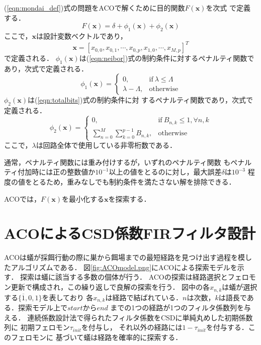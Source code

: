\documentclass[dvipdfmx,9pt]{ieej}
\begin{document}
(\ref{eqn:mondai_def})式の問題をACOで解くために目的関数$F(\bm{x})$を次式
で定義する．
\begin{equation}
 F(\bm{x})=\delta+\phi_{1}(\bm{x})+\phi_{2}(\bm{x})
\end{equation}
ここで，$\bm{x}$は設計変数ベクトルであり，
\begin{equation}
 \bm{x}=[x_{0,0}, x_{0,1}, \cdots, x_{0,p}, x_{1, 0},\cdots, x_{M,p}]^{T}
\end{equation}
で定義される．
$\phi_{1}(\bm{x})$は(\ref{eqn:neibor})式の制約条件に対するペナルティ関数であり，次式で定義される．
\begin{equation}
 \phi_{1}(\bm{x})=\left\{
\begin{array}{ll}
0, & \mbox{if} \ \lambda \leq \Lambda  \\
\lambda-\Lambda, & \mbox{otherwise}
\end{array}
\right.
\end{equation}
$\phi_{2}(\bm{x})$は(\ref{eqn:totalbits})式の制約条件に対
するペナルティ関数であり，次式で定義される．
\begin{equation}
 \phi_{2}(\bm{x})=\left\{
\begin{array}{ll}
 0, & \mbox{if} \ B_{n,k} \leq 1, \forall n, k \\
\displaystyle{\sum_{n=0}^{M}\sum_{k=0}^{p-1}} B_{n,k}, & \mbox{otherwise}
\end{array}
\right.
\end{equation}
ここで，$\lambda$は回路全体で使用している非零桁数である．

通常，ペナルティ関数には重み付けするが，いずれのペナルティ関数
もペナルティ付加時には正の整数値か$10^{-1}$以上の値をとるのに対し，最大誤差$\delta$は$10^{-3}$
程度の値をとるため，重みなしでも制約条件を満たさない解を排除できる．

ACOでは，$F(\bm{x})$を最小化する$\bm{x}$を探索する．


\section{ACOによるCSD係数FIRフィルタ設計}

ACOは蟻が採餌行動の際に巣から餌場までの最短経路を見つけ出す過程を模したアルゴリズムである．
図\ref{fig:ACOmodel.png}にACOによる探索モデルを示す．
探索は蟻に該当する多数の個体が行う．
ACOの探索は経路選択とフェロモン更新で構成され，この繰り返しで良解の探索を行う．
図中の各$x_{n,k}$は蟻が選択する$\{{ \overline{1},0,1}\}$を表しており
各$x_{n,k}$は経路で結ばれている．$n$は次数，$k$は語長である．探索モデル上で$start$から$end$
までの1つの経路が1つのフィルタ係数列を与える．
連続係数設計法で得られたフィルタ係数をCSDに単純丸めした初期係数列に
初期フェロモン$\tau_{init}$を付与し，
それ以外の経路には$1-\tau_{init}$を付与する．このフェロモンに
基づいて蟻は経路を確率的に探索する．
\end{document}

